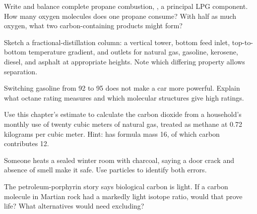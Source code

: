 \begin{sikaoti}
\item Write and balance complete propane combustion, , a principal LPG component. How many oxygen molecules does one propane consume? With half as much oxygen, what two carbon-containing products might form?
\item Sketch a fractional-distillation column: a vertical tower, bottom feed inlet, top-to-bottom temperature gradient, and outlets for natural gas, gasoline, kerosene, diesel, and asphalt at appropriate heights. Note which differing property allows separation.
\item Switching gasoline from 92 to 95 does not make a car more powerful. Explain what octane rating measures and which molecular structures give high ratings.
\item Use this chapter's estimate to calculate the carbon dioxide from a household's monthly use of twenty cubic meters of natural gas, treated as methane at 0.72 kilograms per cubic meter. Hint:  has formula mass 16, of which carbon contributes 12.
\item Someone heats a sealed winter room with charcoal, saying a door crack and absence of smell make it safe. Use particles to identify both errors.
\item The petroleum-porphyrin story says biological carbon is light. If a carbon molecule in Martian rock had a markedly light isotope ratio, would that prove life? What alternatives would need excluding?
\end{sikaoti}
